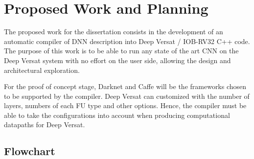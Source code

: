\chapter{Proposed Work and Planning}
\label{chapter:PWP}

The proposed work for the dissertation consists in the development of an
automatic compiler of DNN description into Deep Versat / IOB-RV32 C++ code. The
purpose of this work is to be able to run any state of the art CNN on the Deep
Versat system with no effort on the user side, allowing the design and
architectural exploration.

For the proof of concept stage, Darknet and Caffe will be the frameworks chosen
to be supported by the compiler. Deep Versat can customized with the number of
layers, numbers of each FU type and other options. Hence, the compiler must be
able to take the configurations into account when producing computational
datapaths for Deep Versat.

\section{Flowchart}

